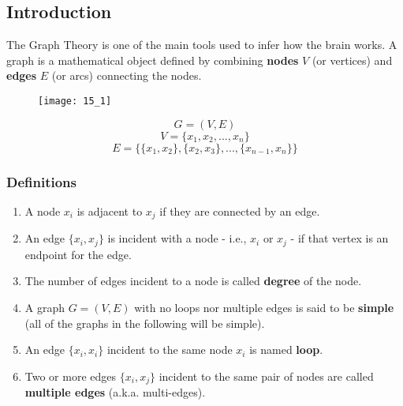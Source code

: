 \subsection{Introduction}
The Graph Theory is one of the main tools used to infer how the brain works. A graph is a mathematical object defined
by combining \textbf{nodes} \(V\) (or vertices) and \textbf{edges} \(E\) (or arcs) connecting the nodes.
\begin{figure}[H]
    \centering
    \texttt{[image: 15\_1]}
\end{figure}
\begin{equation*}
    G=(V,E)
\end{equation*}
\begin{equation*}
    V=\{x_1, x_2, ..., x_n\}
\end{equation*}
\begin{equation*}
    E=\{\{x_1, x_2\}, \{x_2,x_3\},..., \{x_{n-1},x_n\}\}
\end{equation*}
\subsubsection{Definitions}
\begin{enumerate}
    \item A node \(x_i\) is adjacent to \(x_j\) if they are connected by an edge.
    \item An edge \(\{x_i, x_j\}\) is incident with a node - i.e., \(x_i\) or \(x_j\) - if that vertex is an endpoint
          for the edge.
    \item The number of edges incident to a node is called \textbf{degree} of the node.
    \item A graph \(G=(V,E)\) with no loops nor multiple edges is said to be \textbf{simple} (all of the graphs in
          the following will be simple).
    \item An edge \(\{x_i,x_i\}\) incident to the same node \(x_i\) is named \textbf{loop}.
    \item Two or more edges \(\{x_i,x_j\}\) incident to the same pair of nodes are called \textbf{multiple edges}
          (a.k.a. multi-edges).
\end{enumerate}
